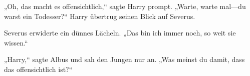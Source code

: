 „Oh, das macht es offensichtlich,“ sagte Harry prompt. „Warte, warte mal—du warst ein Todesser?“ Harry übertrug seinen Blick auf Severus.

Severus erwiderte ein dünnes Lächeln. „Das bin ich immer noch, so weit sie wissen.“

„Harry,“ sagte Albus und sah den Jungen nur an. „Was meinst du damit, dass das offensichtlich ist?“


